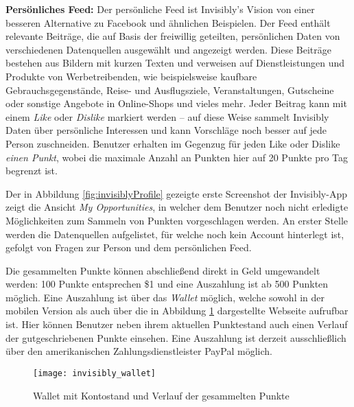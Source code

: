 \noindent \textbf{Persönliches Feed:} Der persönliche Feed ist Invisibly's Vision von einer besseren Alternative zu Facebook und ähnlichen Beispielen. Der Feed enthält relevante Beiträge, die auf Basis der freiwillig geteilten, persönlichen Daten von verschiedenen Datenquellen ausgewählt und angezeigt werden. Diese Beiträge bestehen aus Bildern mit kurzen Texten und verweisen auf Dienstleistungen und Produkte von Werbetreibenden, wie beispielsweise kaufbare Gebrauchsgegenstände, Reise- und Ausflugsziele, Veranstaltungen, Gutscheine oder sonstige Angebote in Online-Shops und vieles mehr. Jeder Beitrag kann mit einem \textit{Like} oder \textit{Dislike} markiert werden -- auf diese Weise sammelt Invisibly Daten über persönliche Interessen und kann Vorschläge noch besser auf jede Person zuschneiden. Benutzer erhalten im Gegenzug für jeden Like oder Dislike \textit{einen Punkt}, wobei die maximale Anzahl an Punkten hier auf 20 Punkte pro Tag begrenzt ist. \cite{invisiblyWhyPay_2021} \newline

\noindent Der in Abbildung \ref{fig:invisiblyProfile} gezeigte erste Screenshot der Invisibly-App zeigt die Ansicht \textit{My Opportunities}, in welcher dem Benutzer noch nicht erledigte Möglichkeiten zum Sammeln von Punkten vorgeschlagen werden. An erster Stelle werden die Datenquellen aufgelistet, für welche noch kein Account hinterlegt ist, gefolgt von Fragen zur Person und dem persönlichen Feed. \newline

\noindent Die gesammelten Punkte können abschließend direkt in Geld umgewandelt werden: 100 Punkte entsprechen \$1 und eine Auszahlung ist ab 500 Punkten möglich. \cite{invisiblyWhyPay_2021} Eine Auszahlung ist über das \textit{Wallet} möglich, welche sowohl in der mobilen Version als auch über die in Abbildung \ref{fig:invisiblyWallet} dargestellte Webseite aufrufbar ist. Hier können Benutzer neben ihrem aktuellen Punktestand auch einen Verlauf der gutgeschriebenen Punkte einsehen. Eine Auszahlung ist derzeit ausschließlich über den amerikanischen Zahlungsdienstleister PayPal möglich. \newline

\begin{figure}[!ht]
	\centering
	\texttt{[image: invisibly\_wallet]}
	\caption{Wallet mit Kontostand und Verlauf der gesammelten Punkte \cite{behanceInvisibly_2021}}
	\label{fig:invisiblyWallet}
\end{figure}
\FloatBarrier

